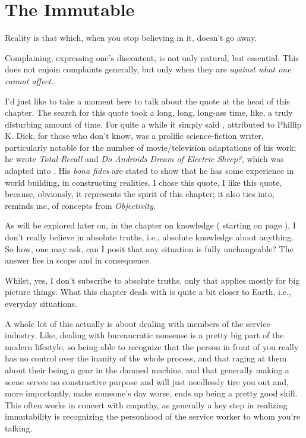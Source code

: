 \documentclass[../butidigress.tex]{subfiles}
\begin{document}
\chapter{The Immutable}\label{chap:immutable}
\epigraph{Reality is that which, when you stop believing in it, doesn't go away.}{}
\newpage
{}
Complaining, expressing one's discontent, is not only natural, but essential.
This does not enjoin complaints generally, but only when they are \emph{against what one cannot affect}.

I'd just like to take a moment here to talk about the quote at the head of this chapter.
The search for this quote took a long, long, long-ass time, like, a truly disturbing amount of time.
For quite a while it simply said , attributed to 
Phillip K. Dick, for those who don't know, was a prolific science-fiction writer, particularly notable for the number of movie/television adaptations of his work; he wrote \textit{Total Recall} and \textit{Do Androids Dream of Electric Sheep?}, which was adapted into .
His \textit{bona fides} are stated to show that he has some experience in world building, in constructing realities.
I chose this quote, I like this quote, because, obviously, it represents the spirit of this chapter; it also ties into, reminds me, of concepts from \textit{Objectivity}.

As will be explored later on, in the chapter on knowledge ( starting on page \pageref{chap:knowledge}), I don't really believe in absolute truths, i.e., absolute knowledge about anything.
So how, one may ask, can I posit that any situation is fully unchangeable?
The answer lies in scope and in consequence.

Whilst, yes, I don't subscribe to absolute truths, only  that applies mostly for big picture things.
What this chapter deals with is quite a bit closer to Earth, i.e., everyday situations.

A whole lot of this actually is about dealing with members of the service industry.
Like, dealing with bureaucratic nonsense is a pretty big part of the modern lifestyle, so being able to recognize that the person in front of you really has no control over the inanity of the whole process, and that raging at them about their being a gear in the damned machine, and that generally making a scene serves no constructive purpose and will just needlessly tire you out and, more importantly, make someone's day worse, ends up being a pretty good skill.
This often works in concert with empathy, as generally a key step in realizing immutability is recognizing the personhood of the service worker to whom you're talking.
\end{document}
